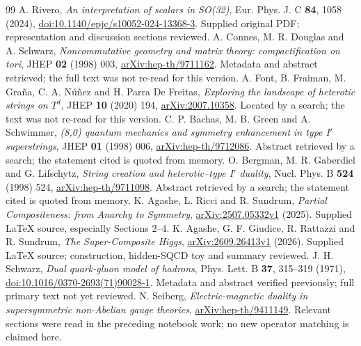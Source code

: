 \documentclass[11pt]{article}
\begin{document}
\begin{thebibliography}{99}
 A. Rivero,
\emph{An interpretation of scalars in SO(32)},
Eur. Phys. J. C \textbf{84}, 1058 (2024),
\href{https://doi.org/10.1140/epjc/s10052-024-13368-3}{doi:10.1140/epjc/s10052-024-13368-3}.
Supplied original PDF; representation and discussion sections reviewed.
 A. Connes, M. R. Douglas and A. Schwarz,
\emph{Noncommutative geometry and matrix theory: compactification on tori},
JHEP \textbf{02} (1998) 003,
\href{https://arxiv.org/abs/hep-th/9711162}{arXiv:hep-th/9711162}.
Metadata and abstract retrieved; the full text was not re-read for this version.
 A. Font, B. Fraiman, M. Gra\~na, C. A. N\'u\~nez and H. Parra De Freitas,
\emph{Exploring the landscape of heterotic strings on $T^d$},
JHEP \textbf{10} (2020) 194,
\href{https://arxiv.org/abs/2007.10358}{arXiv:2007.10358}.
Located by a search; the text was not re-read for this version.
 C. P. Bachas, M. B. Green and A. Schwimmer,
\emph{(8,0) quantum mechanics and symmetry enhancement in type I$'$ superstrings},
JHEP \textbf{01} (1998) 006,
\href{https://arxiv.org/abs/hep-th/9712086}{arXiv:hep-th/9712086}.
Abstract retrieved by a search; the statement cited is quoted from memory.
 O. Bergman, M. R. Gaberdiel and G. Lifschytz,
\emph{String creation and heterotic--type I$'$ duality},
Nucl. Phys. B \textbf{524} (1998) 524,
\href{https://arxiv.org/abs/hep-th/9711098}{arXiv:hep-th/9711098}.
Abstract retrieved by a search; the statement cited is quoted from memory.
 K. Agashe, L. Ricci and R. Sundrum,
\emph{Partial Compositeness: from Anarchy to Symmetry},
\href{https://arxiv.org/abs/2507.05332v1}{arXiv:2507.05332v1} (2025).
Supplied LaTeX source, especially Sections 2--4.
 K. Agashe, G. F. Giudice, R. Rattazzi and R. Sundrum,
\emph{The Super-Composite Higgs},
\href{https://arxiv.org/abs/2609.26413v1}{arXiv:2609.26413v1} (2026).
Supplied LaTeX source; construction, hidden-SQCD toy and summary reviewed.
 J. H. Schwarz, \emph{Dual quark-gluon model of hadrons},
Phys. Lett. B \textbf{37}, 315--319 (1971),
\href{https://doi.org/10.1016/0370-2693(71)90028-1}{doi:10.1016/0370-2693(71)90028-1}.
Metadata and abstract verified previously; full primary text not yet reviewed.
 N. Seiberg, \emph{Electric-magnetic duality in supersymmetric non-Abelian gauge theories},
\href{https://arxiv.org/abs/hep-th/9411149}{arXiv:hep-th/9411149}.
Relevant sections were read in the preceding notebook work; no new operator matching is claimed here.

\end{thebibliography}
\end{document}
